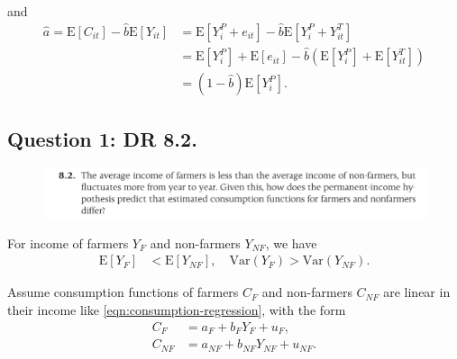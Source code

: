 \documentclass{article}
\newcommand{\E}[1]{\mathrm{E}\left[#1\right]}
\newcommand{\var}[1]{\mathrm{Var}\left(#1\right)}
\begin{document}
        and 
        \begin{align}
            \hat{a}
            = \E{C_{it}} - \hat{b}\E{Y_{it}}
            &= \E{Y_{i}^P + e_{it}} - \hat{b}\E{Y_{i}^P + Y_{it}^T}
            \\
            &= \E{Y_{i}^P} + \E{e_{it}} - \hat{b}\left(\E{Y_{i}^P} + \E{Y_{it}^T}\right)
            \\
            &= \left(1 - \hat{b}\right) \E{Y_{i}^P}.
            \label{eqn:regression-ahat}
        \end{align}

    
        
    
    \subsection{Question 1: DR 8.2.}
        
        \begin{figure}[!h]
            \centering
            \includegraphics[width=\textwidth]{./HW4-DR8.2.png}
        \end{figure}
        
        For income of farmers $Y_F$ and non-farmers $Y_{NF}$, we have
        \begin{align}
            \E{Y_F} &< \E{Y_{NF}}, \quad
            \var{Y_F} > \var{Y_{NF}}.
            \label{eqn:farmers-nonfarmers}
        \end{align}
        
        Assume consumption functions of farmers $C_{F}$ and non-farmers $C_{NF}$ are linear in their income like \eqref{eqn:consumption-regression}, with the form
        \begin{align}
            C_{F} &= a_{F} + b_{F} Y_{F} + u_{F},
            \\
            C_{NF} &= a_{NF} + b_{NF} Y_{NF} + u_{NF}.
        \end{align}
        
\end{document}
